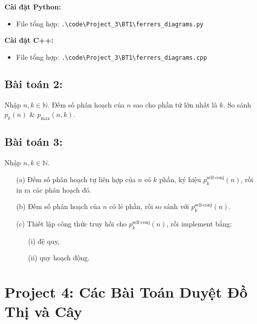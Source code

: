 \documentclass[12pt,a4paper]{article}
\begin{document}
\textbf{Cài đặt Python:}
\begin{itemize}[label=\textbullet]
   \item File tổng hợp: \texttt{.\textbackslash code\textbackslash Project\_3\textbackslash BT1\textbackslash ferrers\_diagrams.py}
\end{itemize}

\textbf{Cài đặt C++:}
\begin{itemize}[label=\textbullet]
   \item File tổng hợp: \texttt{.\textbackslash code\textbackslash Project\_3\textbackslash BT1\textbackslash ferrers\_diagrams.cpp}
\end{itemize}

\subsection{Bài toán 2:}

\begin{problembox}
Nhập $n, k \in \mathbb{N}$. Đếm số phân hoạch của $n$ sao cho phần tử lớn nhất là $k$. So sánh $p_k(n)$ \& $p_{\max}(n, k)$.

\end{problembox}

\subsection{Bài toán 3:}

\begin{problembox}
Nhập $n, k \in \mathbb{N}$.
\begin{enumerate}
    \item[(a)] Đếm số phân hoạch tự liên hợp của $n$ có $k$ phần, ký hiệu $p_k^{\text{self-conj}}(n)$, rồi in ra các phân hoạch đó.
    \item[(b)] Đếm số phân hoạch của $n$ có lẻ phần, rồi so sánh với $p_k^{\text{self-conj}}(n)$.
    \item[(c)] Thiết lập công thức truy hồi cho $p_k^{\text{self-conj}}(n)$, rồi implement bằng:
    \begin{enumerate}
        \item[(i)] đệ quy,
        \item[(ii)] quy hoạch động.
    \end{enumerate}
\end{enumerate}

\end{problembox}

\section{Project 4: Các Bài Toán Duyệt Đồ Thị và Cây}
\end{document}
